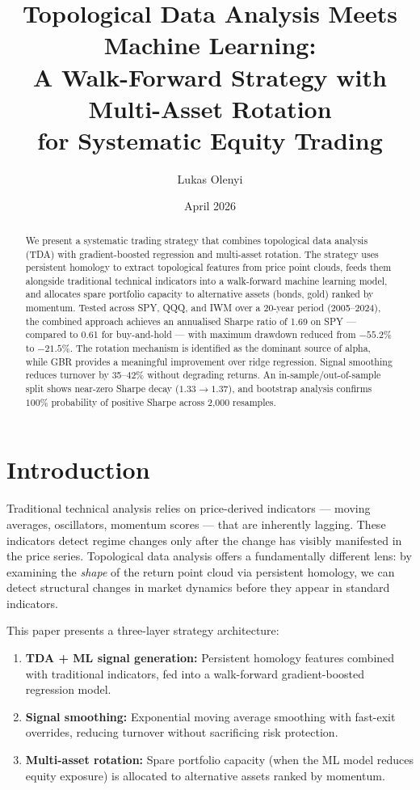 \documentclass[11pt, a4paper]{article}
\title{%
    \textbf{Topological Data Analysis Meets Machine Learning:}\\[0.3em]
    \large A Walk-Forward Strategy with Multi-Asset Rotation\\[0.2em]
    \normalsize for Systematic Equity Trading
}
\author{Lukas Olenyi}
\date{April 2026}
\begin{document}
\maketitle

\begin{abstract}
We present a systematic trading strategy that combines topological data analysis (TDA) with gradient-boosted regression and multi-asset rotation. The strategy uses persistent homology to extract topological features from price point clouds, feeds them alongside traditional technical indicators into a walk-forward machine learning model, and allocates spare portfolio capacity to alternative assets (bonds, gold) ranked by momentum. Tested across SPY, QQQ, and IWM over a 20-year period (2005--2024), the combined approach achieves an annualised Sharpe ratio of 1.69 on SPY --- compared to 0.61 for buy-and-hold --- with maximum drawdown reduced from $-55.2\%$ to $-21.5\%$. The rotation mechanism is identified as the dominant source of alpha, while GBR provides a meaningful improvement over ridge regression. Signal smoothing reduces turnover by 35--42\% without degrading returns. An in-sample/out-of-sample split shows near-zero Sharpe decay ($1.33 \to 1.37$), and bootstrap analysis confirms $100\%$ probability of positive Sharpe across 2{,}000 resamples.
\end{abstract}

\section{Introduction}

Traditional technical analysis relies on price-derived indicators --- moving averages, oscillators, momentum scores --- that are inherently lagging. These indicators detect regime changes only after the change has visibly manifested in the price series. Topological data analysis offers a fundamentally different lens: by examining the \emph{shape} of the return point cloud via persistent homology, we can detect structural changes in market dynamics before they appear in standard indicators.

This paper presents a three-layer strategy architecture:
\begin{enumerate}[nosep]
    \item \textbf{TDA + ML signal generation:} Persistent homology features combined with traditional indicators, fed into a walk-forward gradient-boosted regression model.
    \item \textbf{Signal smoothing:} Exponential moving average smoothing with fast-exit overrides, reducing turnover without sacrificing risk protection.
    \item \textbf{Multi-asset rotation:} Spare portfolio capacity (when the ML model reduces equity exposure) is allocated to alternative assets ranked by momentum.
\end{enumerate}
\end{document}
